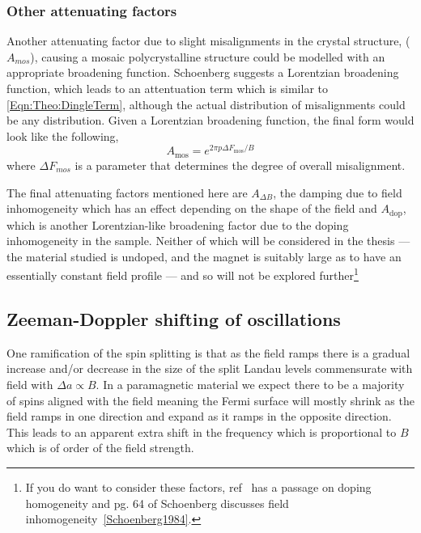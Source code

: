 \subsubsection{Other attenuating factors}

Another attenuating factor due to slight misalignments in the crystal structure, ($A_{mos}$), causing a mosaic polycrystalline structure could be modelled with an appropriate broadening function. Schoenberg suggests a Lorentzian broadening function, which leads to an attentuation term which is similar to \ref{Eqn:Theo:DingleTerm}, although the actual distribution of misalignments could be any distribution. Given a Lorentzian broadening function, the final form would look like the following,
\begin{equation}
  A_{\textrm{mos}} = e^{2\pi p \Delta F_{\textrm{mos}}/B}
\end{equation}
where $\Delta F_{mos}$ is a parameter that determines the degree of overall misalignment.

The final attenuating factors mentioned here are $A_{\Delta B}$, the damping due to field inhomogeneity which has an effect depending on the shape of the field and $A_{\textrm{dop}}$, which is another Lorentzian-like broadening factor due to the doping inhomogeneity in the sample. Neither of which will be considered in the thesis --- the material studied is undoped, and the magnet is suitably large as to have an essentially constant field profile --- and so will not be explored further\footnote{If you do want to consider these factors, ref~\cite{Rourke2010b} has a passage on doping homogeneity and pg. 64 of Schoenberg discusses field inhomogeneity~\ref{Schoenberg1984}.}

\subsection{Zeeman-Doppler shifting of oscillations}

One ramification of the spin splitting is that as the field ramps there is a gradual increase and/or decrease in the size of the split Landau levels commensurate with field with $\Delta a \propto B$. In a paramagnetic material we expect there to be a majority of spins aligned with the field meaning the Fermi surface will mostly shrink as the field ramps in one direction and expand as it ramps in the opposite direction. This leads to an apparent extra shift in the frequency which is proportional to $B$ which is of order of the field strength.


